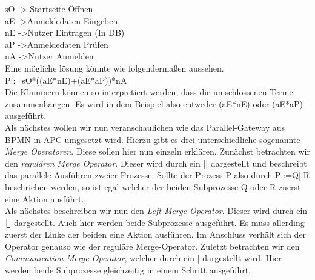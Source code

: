 sO -> Startseite Öffnen\\
aE ->Anmeldedaten Eingeben\\
nE ->Nutzer Eintragen (In DB)\\
aP ->Anmeldedaten Prüfen\\
nA ->Nutzer Anmelden\\
Eine mögliche lösung könnte wie folgendermaßen aussehen.\\
P::=sO*((aE*nE)+(aE*aP))*nA\\
Die Klammern können so interpretiert werden, dass die umschlossenen Terme zusammenhängen. Es wird in dem Beispiel also entweder (aE*nE) oder (aE*aP) ausgeführt.\\
Als nächstes wollen wir nun veranschaulichen wie das Parallel-Gateway aus BPMN in APC umgesetzt wird. Hierzu gibt es drei unterschiedliche sogenannte \textit{Merge Operatoren}. Diese sollen hier nun einzeln erklären.
Zunächst betrachten wir den \textit{regulären Merge Operator}. Dieser wird durch ein || dargestellt und beschreibt das parallele Ausführen zweier Prozesse. Sollte der Prozess P also durch P::=Q||R beschrieben werden, so ist egal welcher der beiden Subprozesse Q oder R zuerst eine Aktion ausführt.\\
Als nächstes beschreiben wir nun den \textit{Left Merge Operator}. Dieser wird durch ein $\lfloor \hspace{-0.25em} \lfloor$ dargestellt. Auch hier werden beide Subprozesse ausgeführt. Es muss allerding zuerst der Linke der beiden eine Aktion ausführen. Im Anschluss verhält sich der Operator genauso wie der reguläre Merge-Operator. Zuletzt betrachten wir den \textit{Communication Merge Operator}, welcher durch ein | dargestellt wird. Hier werden beide Subprozesse gleichzeitig in einem Schritt ausgeführt.
